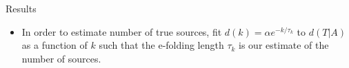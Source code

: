 \documentclass[final]{beamer}
\begin{document}
\begin{frame}{}
\begin{columns}[t]
\begin{column}{.32\linewidth}
\begin{block}{Results}
\begin{itemize}
		  \item In order to estimate number of true sources, fit $d(k)=\alpha e^{-k/\tau_k}$ to $d(T|A)$ as a function of $k$ such that the e-folding length $\tau_k$ is our estimate of the number of sources.
          \end{itemize}
		\begin{figure}
\end{figure}
\end{block}
\end{column}
\end{columns}
\end{frame}
\end{document}
